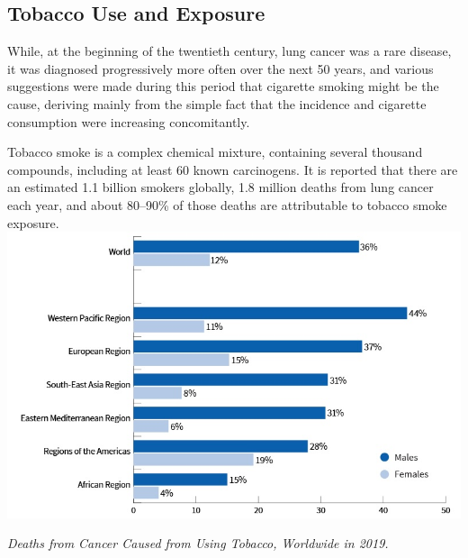 \subsection{Tobacco Use and Exposure}

While, at the beginning of the twentieth century, lung cancer was a rare disease, it was diagnosed 
progressively more often over the next 50 years, and various suggestions were made during this 
period that cigarette smoking might be the cause, deriving mainly from the simple fact that the 
incidence and cigarette consumption were increasing concomitantly.\cite{Lee17} 

Tobacco smoke is a complex chemical mixture, containing several thousand compounds, including at 
least 60 known carcinogens. It is reported that there are an estimated 1.1 billion smokers globally, 
1.8 million deaths from lung cancer each year, and about 80–90\% of those deaths are attributable to 
tobacco smoke exposure.\cite{JOUR} \\ 

\includegraphics[width=\textwidth]{../assets/02-etiology/table-tobacco-use-by-country copy.jpg}
\begin{center} 
    \small\textit{Deaths from Cancer Caused from Using Tobacco, Worldwide in 2019.\cite{sandy2021}}
\end{center} 

